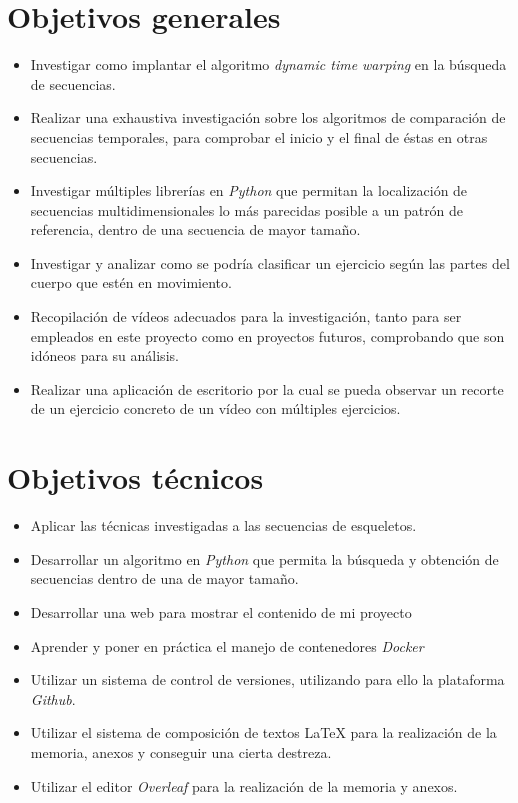 \section{Objetivos generales}
\begin{itemize}
    \item Investigar como implantar el algoritmo \textit{dynamic time warping} en la búsqueda de secuencias.
    \item Realizar una exhaustiva investigación sobre los algoritmos de comparación de secuencias temporales, para comprobar el inicio y el final de éstas en otras secuencias.
    \item Investigar múltiples librerías en \textit{Python} que permitan la localización de secuencias multidimensionales lo más parecidas posible a un patrón de referencia, dentro de una secuencia de mayor tamaño.
    \item Investigar y analizar como se podría clasificar un ejercicio según las partes del cuerpo que estén en movimiento.
    \item Recopilación de vídeos adecuados para la investigación, tanto para ser empleados en este proyecto como en proyectos futuros, comprobando que son idóneos para su análisis. 
    \item Realizar una aplicación de escritorio por la cual se pueda observar un recorte de un ejercicio concreto de un vídeo con múltiples ejercicios.
\end{itemize}

\section{Objetivos técnicos}
\begin{itemize}
    \item Aplicar las técnicas investigadas a las secuencias de esqueletos.
    \item Desarrollar un algoritmo en \textit{Python} que permita la búsqueda y obtención de secuencias dentro de una de mayor tamaño.
    \item Desarrollar una web para mostrar el contenido de mi proyecto
    \item Aprender y poner en práctica el manejo de contenedores \textit{Docker}
    \item Utilizar un sistema de control de versiones, utilizando para ello la plataforma \textit{Github}.
    \item Utilizar el sistema de composición de textos \LaTeX{} para la realización de la memoria, anexos y conseguir una cierta destreza. 
    \item Utilizar el editor \textit{Overleaf} para la realización de la memoria y anexos.
\end{itemize}

